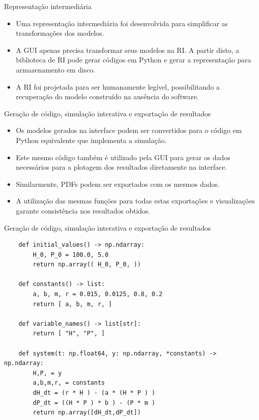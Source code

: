 \begin{frame}{Representação intermediária}
    \begin{itemize}
        \item Uma representação intermediária foi desenvolvida para simplificar as transformações dos modelos.
        \item A GUI apenas precisa transformar seus modelos na RI. A partir disto, a biblioteca de RI pode gerar códigos em Python e gerar a representação para armazenamento em disco.
        \item A RI foi projetada para ser humanamente legível, possibilitando a recuperação do modelo construído na ausência do software.
    \end{itemize}
\end{frame}

\begin{frame}{Geração de código, simulação interativa e exportação de resultados}
    \begin{itemize}
        \item Os modelos gerados na interface podem ser convertidos para o código em Python equivalente que implementa a simulação.
        \item Este mesmo código também é utilizado pela GUI para gerar os dados necessários para a plotagem dos resultados diretamente na interface.
        \item Similarmente, PDFs podem ser exportados com os mesmos dados.
        \item A utilização das mesmas funções para todas estas exportações e visualizações garante consistência nos resultados obtidos.
    \end{itemize}
\end{frame}

\begin{frame}[fragile]{Geração de código, simulação interativa e exportação de resultados}
    \begin{verbatim}
    def initial_values() -> np.ndarray:
        H_0, P_0 = 100.0, 5.0
        return np.array(( H_0, P_0, ))

    def constants() -> list:
        a, b, m, r = 0.015, 0.0125, 0.8, 0.2
        return [ a, b, m, r, ]

    def variable_names() -> list[str]:
        return [ "H", "P", ]

    def system(t: np.float64, y: np.ndarray, *constants) -> np.ndarray:
        H,P, = y
        a,b,m,r, = constants
        dH_dt = (r * H ) - (a * (H * P ) ) 
        dP_dt = ((H * P ) * b ) - (P * m ) 
        return np.array([dH_dt,dP_dt])
    \end{verbatim}
\end{frame}

